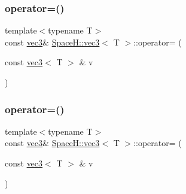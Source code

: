 \mbox{\label{struct_space_h_1_1vec3_a958945cd614424f1c11daf9397370f6a}} 
\subsubsection{\texorpdfstring{operator=()}{operator=()}\hspace{0.1cm}{\footnotesize\ttfamily [1/4]}}
{\footnotesize\ttfamily template$<$typename T$>$ \\
const \mbox{\hyperlink{struct_space_h_1_1vec3}{vec3}}\& \mbox{\hyperlink{struct_space_h_1_1vec3}{Space\+H\+::vec3}}$<$ T $>$\+::operator= (\begin{DoxyParamCaption}\item[{const \mbox{\hyperlink{struct_space_h_1_1vec3}{vec3}}$<$ T $>$ \&}]{v }\end{DoxyParamCaption})\hspace{0.3cm}{\ttfamily [inline]}}

\mbox{\label{struct_space_h_1_1vec3_a958945cd614424f1c11daf9397370f6a}} 
\subsubsection{\texorpdfstring{operator=()}{operator=()}\hspace{0.1cm}{\footnotesize\ttfamily [2/4]}}
{\footnotesize\ttfamily template$<$typename T$>$ \\
const \mbox{\hyperlink{struct_space_h_1_1vec3}{vec3}}\& \mbox{\hyperlink{struct_space_h_1_1vec3}{Space\+H\+::vec3}}$<$ T $>$\+::operator= (\begin{DoxyParamCaption}\item[{const \mbox{\hyperlink{struct_space_h_1_1vec3}{vec3}}$<$ T $>$ \&}]{v }\end{DoxyParamCaption})\hspace{0.3cm}{\ttfamily [inline]}}

\mbox{\label{struct_space_h_1_1vec3_a958945cd614424f1c11daf9397370f6a}} 
